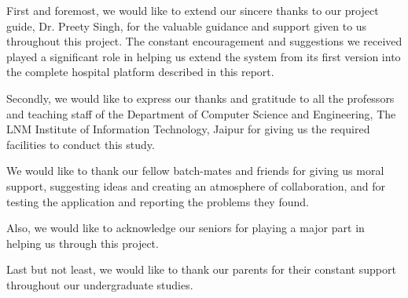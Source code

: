 First and foremost, we would like to extend our sincere thanks to our project guide, Dr. Preety Singh, for the valuable guidance and support given to us throughout this project. The constant encouragement and suggestions we received played a significant role in helping us extend the system from its first version into the complete hospital platform described in this report.

Secondly, we would like to express our thanks and gratitude to all the professors and teaching staff of the Department of Computer Science and Engineering, The LNM Institute of Information Technology, Jaipur for giving us the required facilities to conduct this study.

We would like to thank our fellow batch-mates and friends for giving us moral support, suggesting ideas and creating an atmosphere of collaboration, and for testing the application and reporting the problems they found.

Also, we would like to acknowledge our seniors for playing a major part in helping us through this project.

Last but not least, we would like to thank our parents for their constant support throughout our undergraduate studies.
